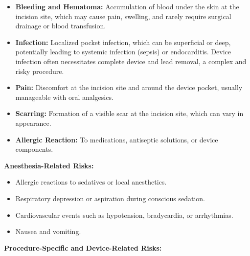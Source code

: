 \begin{itemize}
  \item \textbf{Bleeding and Hematoma:} Accumulation of blood under the skin at the incision site, which may cause pain, swelling, and rarely require surgical drainage or blood transfusion.
  
  \item \textbf{Infection:} Localized pocket infection, which can be superficial or deep, potentially leading to systemic infection (sepsis) or endocarditis. Device infection often necessitates complete device and lead removal, a complex and risky procedure.
  
  \item \textbf{Pain:} Discomfort at the incision site and around the device pocket, usually manageable with oral analgesics.
  
  \item \textbf{Scarring:} Formation of a visible scar at the incision site, which can vary in appearance.
  
  \item \textbf{Allergic Reaction:} To medications, antiseptic solutions, or device components.
\end{itemize}

\textbf{Anesthesia-Related Risks:}

\begin{itemize}
  \item Allergic reactions to sedatives or local anesthetics.
  
  \item Respiratory depression or aspiration during conscious sedation.
  
  \item Cardiovascular events such as hypotension, bradycardia, or arrhythmias.
  
  \item Nausea and vomiting.
\end{itemize}

\textbf{Procedure-Specific and Device-Related Risks:}

